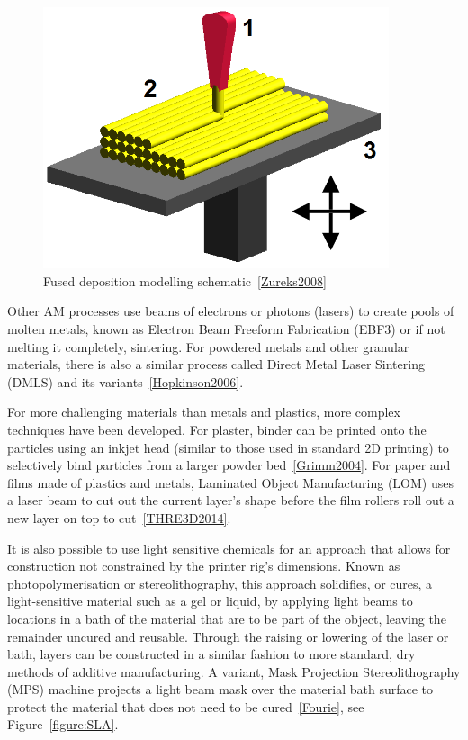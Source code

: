 \documentclass[11pt]{report} %
\begin{document}
\begin{figure}[H]
  \centering
  \includegraphics[width=4in]{FDM_by_Zureks.png}
  \caption{Fused deposition modelling schematic~\ref{Zureks2008}}
  \label{figure:FDM}
\end{figure}

Other AM processes use beams of electrons or photons (lasers) to create pools of molten metals, known as Electron Beam Freeform Fabrication (EBF3) or if not melting it completely, sintering. For powdered metals and other granular materials, there is also a similar process called Direct Metal Laser Sintering (DMLS) and its variants~\ref{Hopkinson2006}.

For more challenging materials than metals and plastics, more complex techniques have been developed. For plaster, binder can be printed onto the particles using an inkjet head (similar to those used in standard 2D printing) to selectively bind particles from a larger powder bed~\ref{Grimm2004}. For paper and films made of plastics and metals, Laminated Object Manufacturing (LOM) uses a laser beam to cut out the current layer's shape before the film rollers roll out a new layer on top to cut~\ref{THRE3D2014}.

It is also possible to use light sensitive chemicals for an approach that allows for construction not constrained by the printer rig's dimensions. Known as photopolymerisation or stereolithography, this approach solidifies, or cures, a light-sensitive material such as a gel or liquid, by applying light beams to locations in a bath of the material that are to be part of the object, leaving the remainder uncured and reusable. Through the raising or lowering of the laser or bath, layers can be constructed in a similar fashion to more standard, dry methods of additive manufacturing. A variant, Mask Projection Stereolithography (MPS) machine projects a light beam mask over the material bath surface to protect the material that does not need to be cured~\ref{Fourie}, see Figure~\ref{figure:SLA}.
\end{document}
